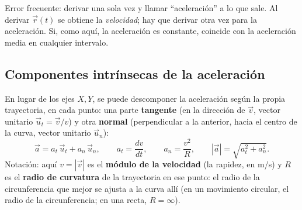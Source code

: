 \documentclass[11pt,a4paper]{article}
\begin{document}
\begin{ojo}
Error frecuente: derivar una sola vez y llamar ``aceleración'' a lo que sale. Al derivar $\vec r(t)$ se obtiene la \emph{velocidad}; hay que derivar otra vez para la aceleración. Si, como aquí, la aceleración es constante, coincide con la aceleración media en cualquier intervalo.
\end{ojo}

\subsection{Componentes intrínsecas de la aceleración}\label{sec:intr}
En lugar de los ejes $X,Y$, se puede descomponer la aceleración según la propia trayectoria, en cada punto: una parte \textbf{tangente} (en la dirección de $\vec v$, vector unitario $\vec u_t=\vec v/v$) y otra \textbf{normal} (perpendicular a la anterior, hacia el centro de la curva, vector unitario $\vec u_n$):
\[
\vec a=a_t\,\vec u_t+a_n\,\vec u_n,\qquad a_t=\frac{dv}{dt},\qquad a_n=\frac{v^2}{R},\qquad |\vec a|=\sqrt{a_t^2+a_n^2}.
\]
Notación: aquí $v=|\vec v|$ es el \textbf{módulo de la velocidad} (la rapidez, en m/s) y $R$ es el \textbf{radio de curvatura} de la trayectoria en ese punto: el radio de la circunferencia que mejor se ajusta a la curva allí (en un movimiento circular, el radio de la circunferencia; en una recta, $R=\infty$).

\begin{center}
\end{center}
\end{document}

